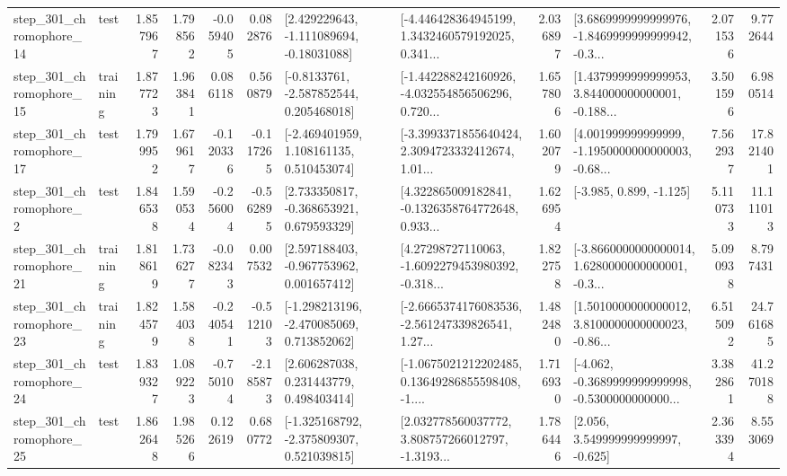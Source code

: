 \begin{tabular}{llrrrrllrlrr}
  step\_301\_chromophore\_14 &      test &      1.857967 &    1.798562 &     -0.059405 &  0.082876 &    [2.429229643, -1.111089694, -0.18031088] &  [-4.446428364945199, 1.3432460579192025, 0.341... &       2.036897 &  [3.6869999999999976, -1.8469999999999942, -0.3... &            2.071536 &          9.772644 \\
  step\_301\_chromophore\_15 &  training &      1.877723 &    1.963841 &      0.086118 &  0.560879 &     [-0.8133761, -2.587852544, 0.205468018] &  [-1.442288242160926, -4.032554856506296, 0.720... &       1.657806 &  [1.4379999999999953, 3.844000000000001, -0.188... &            3.501596 &          6.980514 \\
  step\_301\_chromophore\_17 &      test &      1.799952 &    1.679617 &     -0.120336 & -0.117265 &    [-2.469401959, 1.108161135, 0.510453074] &  [-3.3993371855640424, 2.3094723332412674, 1.01... &       1.602079 &  [4.001999999999999, -1.1950000000000003, -0.68... &            7.562937 &         17.821401 \\
   step\_301\_chromophore\_2 &      test &      1.846538 &    1.590534 &     -0.256004 & -0.562895 &    [2.733350817, -0.368653921, 0.679593329] &  [4.322865009182841, -0.1326358764772648, 0.933... &       1.626954 &                            [-3.985, 0.899, -1.125] &            5.110733 &         11.111013 \\
  step\_301\_chromophore\_21 &  training &      1.818619 &    1.736277 &     -0.082343 &  0.007532 &    [2.597188403, -0.967753962, 0.001657412] &  [4.27298727110063, -1.6092279453980392, -0.318... &       1.822758 &  [-3.8660000000000014, 1.6280000000000001, -0.3... &            5.090938 &          8.797431 \\
  step\_301\_chromophore\_23 &  training &      1.824579 &    1.584038 &     -0.240541 & -0.512103 &   [-1.298213196, -2.470085069, 0.713852062] &  [-2.6665374176083536, -2.561247339826541, 1.27... &       1.482480 &  [1.5010000000000012, 3.8100000000000023, -0.86... &            6.515092 &         24.761685 \\
  step\_301\_chromophore\_24 &      test &      1.839327 &    1.089223 &     -0.750104 & -2.185873 &     [2.606287038, 0.231443779, 0.498403414] &  [-1.0675021212202485, 0.13649286855598408, -1.... &       1.716930 &  [-4.062, -0.3689999999999998, -0.5300000000000... &            3.382861 &         41.270188 \\
  step\_301\_chromophore\_25 &      test &      1.862648 &    1.985266 &      0.122619 &  0.680772 &   [-1.325168792, -2.375809307, 0.521039815] &  [2.032778560037772, 3.808757266012797, -1.3193... &       1.786446 &                 [2.056, 3.549999999999997, -0.625] &            2.363394 &          8.553069 \\

\end{tabular}
